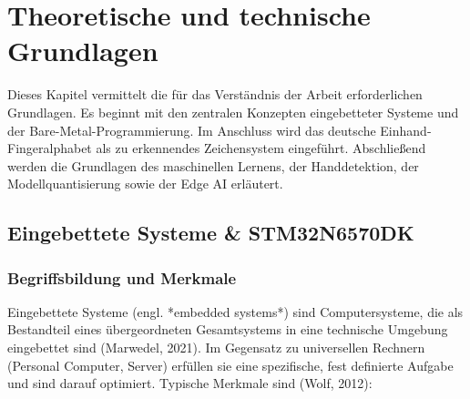 \chapter{Theoretische und technische Grundlagen}

Dieses Kapitel vermittelt die für das Verständnis der Arbeit erforderlichen Grundlagen. Es beginnt mit den zentralen Konzepten eingebetteter Systeme und der Bare-Metal-Programmierung.  Im Anschluss wird das deutsche Einhand-Fingeralphabet als zu erkennendes Zeichensystem eingeführt. Abschließend werden die Grundlagen des maschinellen Lernens, der Handdetektion, der Modellquantisierung sowie der Edge AI erläutert.

\section{Eingebettete Systeme \& STM32N6570DK}
\subsection{Begriffsbildung und Merkmale}

Eingebettete Systeme (engl. *embedded systems*) sind Computersysteme, die als Bestandteil eines übergeordneten Gesamtsystems in eine technische Umgebung eingebettet sind (Marwedel, 2021). Im Gegensatz zu universellen Rechnern (Personal Computer, Server) erfüllen sie eine spezifische, fest definierte Aufgabe und sind darauf optimiert. Typische Merkmale sind (Wolf, 2012):

